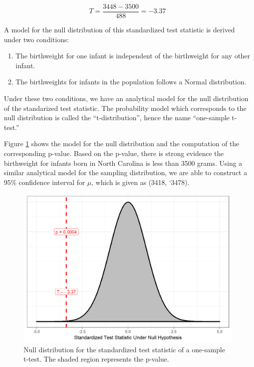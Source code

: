 \documentclass[]{book}
\providecommand{\tightlist}{%
  \setlength{\itemsep}{0pt}\setlength{\parskip}{0pt}}
\theoremstyle{definition}
\theoremstyle{definition}
\theoremstyle{definition}
\theoremstyle{remark}
\begin{document}
\[T = \frac{3448 - 3500}{488} = -3.37\]

A model for the null distribution of this standardized test statistic is
derived under two conditions:

\begin{enumerate}
\def\labelenumi{\arabic{enumi}.}
\tightlist
\item
  The birthweight for one infant is independent of the birthweight for
  any other infant.
\item
  The birthweights for infants in the population follows a Normal
  distribution.
\end{enumerate}

Under these two conditions, we have an analytical model for the null
distribution of the standarized test statistic. The probability model
which corresponds to the null distribution is called the
``t-distribution'', hence the name ``one-sample t-test.''

Figure \ref{fig:onemean-t-test} shows the model for the null
distribution and the computation of the corresponding p-value. Based on
the p-value, there is strong evidence the birthweight for infants born
in North Carolina is less than 3500 grams. Using a similar analytical
model for the sampling distribution, we are able to construct a 95\%
confidence interval for \(\mu\), which is given as (3418, `3478).

\begin{figure}

{\centering \includegraphics[width=0.8\linewidth]{./Images/onemean-t-test-1} 

}

\caption{Null distribution for the standardized test statistic of a one-sample t-test.  The shaded region represents the p-value.}\label{fig:onemean-t-test}
\end{figure}
\end{document}
